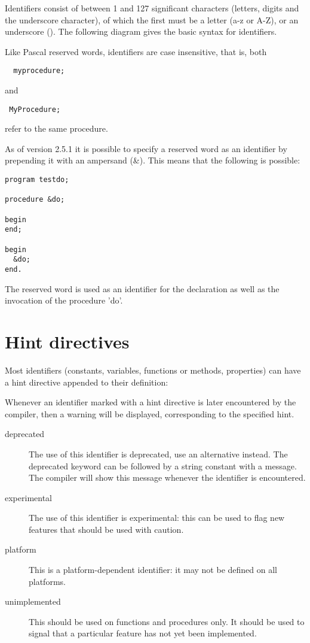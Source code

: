 Identifiers consist of between 1 and 127 significant characters (letters, digits and
the underscore character), of which the first must be a letter (a-z or A-Z), 
or an underscore (\var{\_}).
The following diagram gives the basic syntax for identifiers.

Like Pascal reserved words, identifiers are case insensitive, that is, both
\begin{verbatim}
  myprocedure;
\end{verbatim}
and
\begin{verbatim}
 MyProcedure;
\end{verbatim}
refer to the same procedure.

\begin{remark}
As of version 2.5.1 it is possible to specify a reserved word as an identifier by 
prepending it with an ampersand (\&). This means that the following is possible:
\begin{verbatim}
program testdo;

procedure &do;

begin
end;

begin
  &do;
end.
\end{verbatim}
The reserved word  is used as an identifier for the declaration as
well as the invocation of the procedure 'do'.
\end{remark}
 
\section{Hint directives}
Most identifiers (constants, variables, functions or methods, properties) can have a 
hint directive appended to their definition:


Whenever an identifier marked with a hint directive is  later encountered by
the compiler, then a warning will be displayed, corresponding to the
specified hint.
\begin{description}
\item[deprecated] The use of this identifier is deprecated, use an
alternative instead. The deprecated keyword can be followed by a string
constant with a message. The compiler will show this message whenever the
identifier is encountered. 
\item[experimental] The use of this identifier is experimental: this can be
used to flag new features that should be used with caution.
\item[platform] This is a platform-dependent identifier: it may not be
defined on all platforms. 
\item[unimplemented] This should be used on functions and procedures only.
It should be used to signal that a particular feature has not yet been
implemented. 
\end{description}

